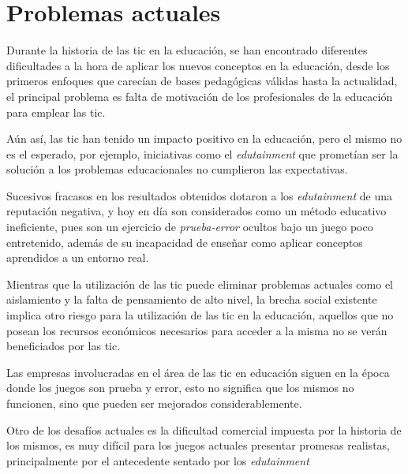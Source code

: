 \section{Problemas actuales}

Durante la historia de las \Gls{tic} en la educación, se han encontrado
diferentes dificultades a la hora de aplicar los nuevos conceptos en la
educación, desde los primeros enfoques que carecían de bases pedagógicas válidas
hasta la actualidad, el principal problema es falta de motivación de los
profesionales de la educación para emplear las
\Gls{tic}\cite{punie:ict,ict:romeo}.


Aún así, las \Gls{tic} han tenido un impacto positivo en la educación, pero el
mismo no es el esperado\cite{punie:ict}, por ejemplo, iniciativas como el
\emph{edutainment} que prometían ser la solución a los problemas
educacionales no cumplieron las expectativas. 

Sucesivos fracasos en los resultados obtenidos dotaron a los \emph{edutainment}
de una reputación negativa, y hoy en día son considerados como un método educativo 
ineficiente, pues son un ejercicio de \emph{prueba-error} ocultos bajo un juego poco 
entretenido, además de su incapacidad de enseñar como aplicar conceptos aprendidos 
a un entorno real\cite{resnick:2004}.

Mientras que la utilización de las \Gls{tic} puede eliminar problemas actuales
como el aislamiento y la falta de pensamiento de alto nivel\cite{punie:ict}, la
brecha social existente implica otro riesgo para la utilización de las \Gls{tic}
en la educación, aquellos que no posean los recursos económicos necesarios para
acceder a la misma no se verán beneficiados por las \Gls{tic}\cite{punie:ict}.

Las empresas involucradas en el área de las \Gls{tic} en
educación siguen en la época donde los juegos son prueba y error, esto no
significa que los mismos no funcionen, sino que pueden ser mejorados
considerablemente\cite{egenfeldt2007third}.

Otro de los desafíos actuales es la dificultad comercial impuesta por la
historia de los mismos, es muy difícil para los juegos actuales presentar
promesas realistas, principalmente por el antecedente sentado por los
\emph{edutainment}\cite{egenfeldt2007third}
